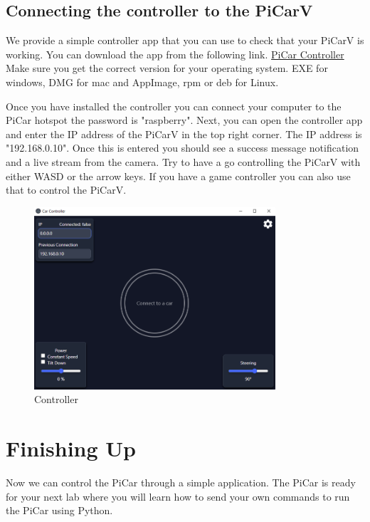\documentclass[11pt]{report}
\begin{document}
\section{Connecting the controller to the PiCarV}
We provide a simple controller app that you can use to check that your PiCarV is working. You can download the app from the following link. 
\href{https://github.com/PiCarV/Controller/releases/latest}{PiCar Controller} Make sure you get the correct version for your operating system. EXE for windows, DMG for mac and AppImage, rpm or deb for Linux.


Once you have installed the controller you can connect your computer to the PiCar hotspot the password is "raspberry". Next, you can open the controller app and enter the IP address of the PiCarV in the top right corner. The IP address is "192.168.0.10". Once this is entered you should see a success message notification and a live stream from the camera. Try to have a go controlling the PiCarV with either WASD or the arrow keys. If you have a game controller you can also use that to control the PiCarV.

\begin{figure}[h]
    \centering
    \includegraphics[width=0.8\textwidth]{controller.png}
    \caption{Controller}
    \label{fig:Controller}
\end{figure}

\pagebreak


\chapter{Finishing Up}
Now we can control the PiCar through a simple application. The PiCar is ready for your next lab where you will learn how to send your own commands to run the PiCar using Python.
\end{document}
